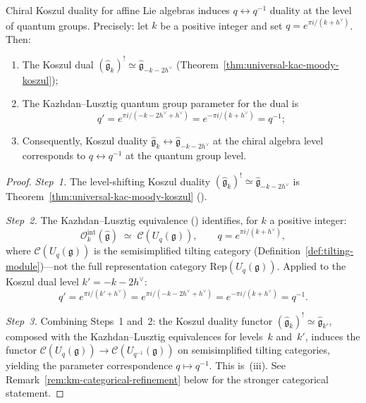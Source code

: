 \begin{theorem}\label{thm:km-quantum-groups}
Chiral Koszul duality for affine Lie algebras induces $q \leftrightarrow q^{-1}$
duality at the level of quantum groups.  Precisely: let $k$ be a positive
integer and set $q = e^{\pi i/(k + h^\vee)}$.  Then:
\begin{enumerate}[label=\textup{(\roman*)}]
\item The Koszul dual $(\widehat{\mathfrak{g}}_k)^! \simeq \widehat{\mathfrak{g}}_{-k-2h^\vee}$
\textup{(}Theorem~\textup{\ref{thm:universal-kac-moody-koszul});}
\item The Kazhdan--Lusztig quantum group parameter for the dual is
\begin{equation}\label{eq:q-inversion}
q' = e^{\pi i/(-k-2h^\vee + h^\vee)} = e^{-\pi i/(k+h^\vee)} = q^{-1};
\end{equation}
\item Consequently, Koszul duality $\widehat{\mathfrak{g}}_k \leftrightarrow \widehat{\mathfrak{g}}_{-k-2h^\vee}$
at the chiral algebra level corresponds to $q \leftrightarrow q^{-1}$ at the quantum group level.
\end{enumerate}
\end{theorem}

\begin{proof}
\emph{Step~1.}
The level-shifting Koszul duality
$(\widehat{\mathfrak{g}}_k)^! \simeq \widehat{\mathfrak{g}}_{-k-2h^\vee}$
is Theorem~\ref{thm:universal-kac-moody-koszul} (\ClaimStatusProvedHere).

\emph{Step~2.}
The Kazhdan--Lusztig equivalence \cite{KL93}
(\ClaimStatusProvedElsewhere) identifies, for $k$ a positive integer:
\[
\mathcal{O}_k^{\mathrm{int}}(\widehat{\mathfrak{g}})
\;\simeq\;
\mathcal{C}(U_q(\mathfrak{g})), \qquad
q = e^{\pi i/(k + h^\vee)},
\]
where $\mathcal{C}(U_q(\mathfrak{g}))$ is the semisimplified tilting
category (Definition~\ref{def:tilting-module})---not the full
representation category $\mathrm{Rep}(U_q(\mathfrak{g}))$.
Applied to the Koszul dual level $k' = -k - 2h^\vee$:
\[
q' = e^{\pi i/(k' + h^\vee)}
= e^{\pi i/(-k - 2h^\vee + h^\vee)}
= e^{-\pi i/(k + h^\vee)}
= q^{-1}.
\]

\emph{Step~3.}
Combining Steps~1 and~2: the Koszul duality functor
$(\widehat{\mathfrak{g}}_k)^! \simeq \widehat{\mathfrak{g}}_{k'}$,
composed with the Kazhdan--Lusztig equivalences
for levels~$k$ and~$k'$, induces the functor
$\mathcal{C}(U_q(\mathfrak{g})) \to
\mathcal{C}(U_{q^{-1}}(\mathfrak{g}))$
on semisimplified tilting categories,
yielding the parameter correspondence
$q \mapsto q^{-1}$.  This is~(iii).  See Remark~\ref{rem:km-categorical-refinement}
below for the stronger categorical statement.
\end{proof}

